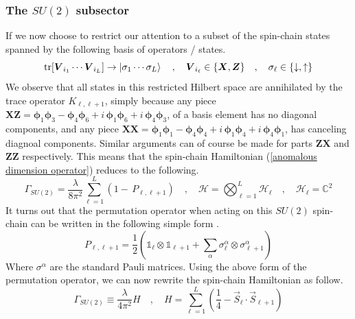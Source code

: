 \subsubsection{The $SU(2)$ subsector}
If we now choose to restrict our attention to a subset of the spin-chain states spanned by the following basis of operators / states.
%
%
\begin{equation}
\tr[ \boldsymbol{V}_{i_1} \cdots \boldsymbol{V}_{i_L} ] \to \ket{\sigma_1 \cdots \sigma_L}
%
\quad , \quad
%
\boldsymbol{V}_{i_\ell} \in \{ \boldsymbol{X}, \boldsymbol{Z} \}
%
\quad , \quad
%
\sigma_\ell \in \{ \downarrow, \uparrow \}
\end{equation}
%
%
We observe that all states in this restricted Hilbert space are annihilated by the trace operator $K_{\ell, \ell+1}$, simply because any piece $\boldsymbol{X} \boldsymbol{Z} = \boldsymbol{\phi}_1 \boldsymbol{\phi}_3 - \boldsymbol{\phi}_4 \boldsymbol{\phi}_6 + i \, \boldsymbol{\phi}_1 \boldsymbol{\phi}_6 + i \, \boldsymbol{\phi}_4 \boldsymbol{\phi}_3$, of a basis element has no diagonal components, and any piece $\boldsymbol{X} \boldsymbol{X} = \boldsymbol{\phi}_1 \boldsymbol{\phi}_1 - \boldsymbol{\phi}_4 \boldsymbol{\phi}_4 + i \, \boldsymbol{\phi}_1 \boldsymbol{\phi}_4 + i \, \boldsymbol{\phi}_4 \boldsymbol{\phi}_1$, has canceling diagnoal components. Similar arguments can of course be made for parts $\boldsymbol{Z} \boldsymbol{X}$ and $\boldsymbol{Z} \boldsymbol{Z}$ respectively. This means that the spin-chain Hamiltonian (\ref{anomalous dimension operator}) reduces to the following.
%
%
\begin{equation}
\Gamma_{SU(2)} = \frac{\lambda}{8 \pi^2}\sum_{\ell=1}^L \left(
1 - \, P_{\ell,\ell + 1}
\right)
%
\quad , \quad
%
\mathcal{H} = \bigotimes_{\ell=1}^L \mathcal{H}_\ell
%
\quad , \quad
%
\mathcal{H}_\ell = \mathbb{C}^2
\end{equation}
%
%
It turns out that the permutation operator when acting on this $SU(2)$ spin-chain can be written in the following simple form \cite{Algebraic Bethe Ansatz}.
%
%
\begin{equation}
P_{\ell, \ell+1}
=
\frac{1}{2} \left(
\mathbb{1}_\ell \otimes \mathbb{1}_{\ell+1}
+
\sum_\alpha \sigma^\alpha_\ell \otimes \sigma^\alpha_{\ell+1}
\right)
\end{equation}
%
%
Where $\sigma^\alpha$ are the standard Pauli matrices. Using the above form of the permutation operator, we can now rewrite the spin-chain Hamiltonian as follow.
%
%
\begin{equation}
\Gamma_{SU(2)} \equiv  \frac{\lambda}{4 \pi^2} H
%
\quad , \quad
%
H = \sum_{\ell=1}^L \left(
\frac{1}{4} - \vec{S}_\ell \cdot \vec{S}_{\ell+1}
\right)
\end{equation}
